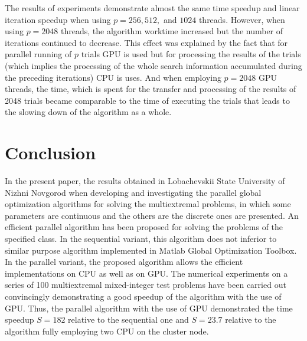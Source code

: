 \documentclass{llncs}
\begin{document}
The results of experiments demonstrate almost the same time speedup and linear iteration 
speedup when using $p=256, 512,$ and $1024$ threads. However, when using $p=2048$ 
threads, the algorithm worktime increased but the number of iterations continued to decrease. 
This effect was explained by the fact that for parallel running of $p$ trials GPU is used but for 
processing the results of the trials (which implies the processing of the whole search information 
accumulated during the preceding iterations) CPU is uses. And when employing $p=2048$ 
GPU threads, the time, which is spent for the transfer and processing of the results of 2048 
trials became comparable to the time of executing the trials that leads to the slowing down of 
the algorithm as a whole.


\section{Conclusion}
In the present paper, the results obtained in Lobachevskii State University of Nizhni Novgorod 
when developing and investigating the parallel global optimization algorithms for solving the 
multiextremal problems, in which some parameters are continuous and the others are the discrete 
ones are presented. 
An efficient parallel algorithm has been proposed for solving the problems of the specified class. 
In the sequential variant, this algorithm does not inferior to similar purpose algorithm 
implemented in Matlab Global Optimization Toolbox.
In the parallel variant, the proposed algorithm allows the efficient implementations on CPU as 
well as on GPU. 
The numerical experiments on a series of 100 multiextremal mixed-integer test problems have been carried out 
convincingly demonstrating a good speedup of the algorithm with the use of GPU.
Thus, the parallel algorithm with the use of GPU demonstrated the time speedup $S = 182$ 
relative to the sequential one and $S = 23.7$ relative to the algorithm fully employing two CPU on 
the cluster node.
\end{document}
